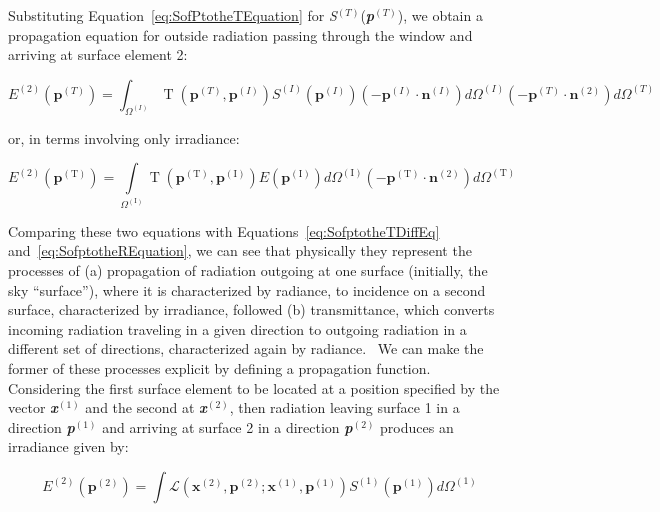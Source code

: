 Substituting Equation~\ref{eq:SofPtotheTEquation} for \emph{S}\(^{(T)}\)(\textbf{\emph{p}}\(^{(T)}\)), we obtain a propagation equation for outside radiation passing through the window and arriving at surface element 2:

\begin{equation}
E^{(2)}(\mathbf{p}^{(T)}) = \int_{\Omega^{(I)}}
      \operatorname{T} (\mathbf{p}^{(T)},\mathbf{p}^{(I)})
      S^{(I)}(\mathbf{p}^{(I)})(-\mathbf{p}^{(I)}\cdot\mathbf{n}^{(I)})
      d\Omega^{(I)}(-\mathbf{p}^{(T)}\cdot\mathbf{n}^{(2)})d\Omega^{(T)}
\end{equation}

or, in terms involving only irradiance:

\begin{equation}
{E^{{\mathrm{(2)}}}}({{\mathbf{p}}^{{\mathrm{(T)}}}}) = \int\limits_{{\Omega ^{{\mathrm{(I)}}}}} {\operatorname{T} ({{\mathbf{p}}^{{\mathrm{(T)}}}},{{\mathbf{p}}^{{\mathrm{(I)}}}})E({{\mathbf{p}}^{{\mathrm{(I)}}}})d{\Omega ^{{\mathrm{(I)}}}}} \left( { - {{\mathbf{p}}^{{\mathrm{(T)}}}} \cdot {{\mathbf{n}}^{{\mathrm{(2)}}}}} \right)d{\Omega ^{{\mathrm{(T)}}}}
\end{equation}

Comparing these two equations with Equations~\ref{eq:SofptotheTDiffEq} and~\ref{eq:SofptotheREquation}, we can see that physically they represent the processes of (a) propagation of radiation outgoing at one surface (initially, the sky ``surface''), where it is characterized by radiance, to incidence on a second surface, characterized by irradiance, followed (b) transmittance, which converts incoming radiation traveling in a given direction to outgoing radiation in a different set of directions, characterized again by radiance.~ We can make the former of these processes explicit by defining a propagation function.~ Considering the first surface element to be located at a position specified by the vector \textbf{\emph{x}}\(^{(1)}\) and the second at \textbf{\emph{x}}\(^{(2)}\), then radiation leaving surface 1 in a direction \textbf{\emph{p}}\(^{(1)}\) and arriving at surface 2 in a direction \textbf{\emph{p}}\(^{(2)}\) produces an irradiance given by:

\begin{equation}
{E^{(2)}}({{\mathbf{p}}^{{\mathrm{(2)}}}}) = \int {\mathcal{L}({{\mathbf{x}}^{{\mathrm{(2)}}}},{{\mathbf{p}}^{{\mathrm{(2)}}}};{{\mathbf{x}}^{{\mathrm{(1)}}}},{{\mathbf{p}}^{{\mathrm{(1)}}}}){S^{{\mathrm{(1)}}}}({{\mathbf{p}}^{{\mathrm{(1)}}}})} d{\Omega ^{{\mathrm{(1)}}}}
\label{eq:E2p2Equation}
\end{equation}

